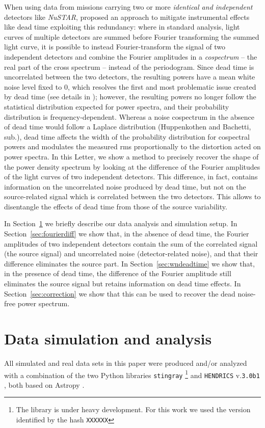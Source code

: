 \documentclass[twocolumn]{aastex61}
\newcommand{\project}[1]{\textsl{#1}}
\newcommand{\nustar}{\project{NuSTAR}\xspace}
\newcommand{\sref}{Section~\ref}
\begin{document}
When using data from missions carrying two or more \textit{identical and independent} detectors like \nustar, \citet{Bachetti+15} proposed an approach to mitigate instrumental effects like dead time exploiting this redundancy: 
where in standard analysis, light curves of multiple detectors are summed before Fourier transforming the summed light curve, 
it is possible to instead Fourier-transform the signal of two independent detectors and combine the Fourier amplitudes in a \textit{cospectrum} -- the real part of the cross spectrum -- instead of the periodogram. 
Since dead time is uncorrelated between the two detectors, the resulting powers have a mean white noise level fixed to 0, which resolves the first and most problematic issue created by dead time (see details in \citealt{Bachetti+15}); however, the resulting powers no longer follow the statistical distribution expected for power spectra, and their probability distribution is frequency-dependent.
Whereas a noise cospectrum in the absence of dead time would follow a Laplace distribution (Huppenkothen and Bachetti, sub.),
dead time affects the width of the probability distribution for cospectral powers and modulates the measured rms proportionally to the distortion acted on power spectra.
In this Letter, we show a method to precisely recover the shape of the power density spectrum by looking at the difference of the Fourier amplitudes of the light curves of two independent detectors.
This difference, in fact, contains information on the uncorrelated noise produced by dead time, but not on the source-related  signal which is correlated between the two detectors.
This allows to disentangle the effects of dead time from those of the source variability.

In \sref{sec:data} we briefly describe our data analysis and simulation setup.
In \sref{sec:fourierdiff} we show that, in the absence of dead time, the Fourier amplitudes of two independent detectors contain the sum of the correlated signal (the source signal) and uncorrelated noise (detector-related noise), and that their difference eliminates the source part. 
In \sref{sec:wndeadtime} we show that, in the presence of dead time, the difference of the Fourier amplitude still eliminates the source signal but retains information on dead time effects.
In \sref{sec:correction} we show that this can be used to recover the dead noise-free power spectrum.

\section{Data simulation and analysis} \label{sec:data}
All simulated and real data sets in this paper were produced and/or analyzed with a combination of the two Python libraries \texttt{stingray}%
\footnote{The library is under heavy development.
    For this work we used the version identified by the hash \texttt{XXXXXX}}
\citep{huppenkothen2016} and \texttt{HENDRICS} v.\texttt{3.0b1} \citep[formerly known as MaLTPyNT;][]{2015ascl.soft02021B}, both based on Astropy \citep{astropy2013}.
\end{document}
